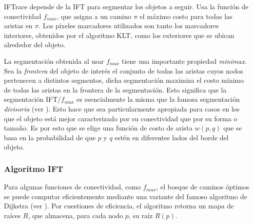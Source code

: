 IFTrace depende de la IFT para segmentar los objetos a seguir. Usa la función
de conectividad $f_{max}$, que asigna a un camino $\pi$ el máximo costo para
todas las aristas en $\pi$. Los píxeles marcadores utilizados son tanto los
marcadores interiores, obtenidos por el algoritmo KLT, como los exteriores que
se ubican alrededor del objeto.

La segmentación obtenida al usar $f_{max}$ tiene una importante propiedad
\textit{minimax}. Sea la \textit{frontera} del objeto de interés el conjunto de
todas las aristas cuyos nodos pertenecen a distintos segmentos, dicha
segmentación maximiza el costo mínimo de todas las aristas en la frontera de la
segmentación. Esto significa que la segmentación IFT/$f_{max}$ es esencialmente
la misma que la famosa segmentación \textit{divisoria} (ver
\cite{IFT}). Esto hace que sea particularmente apropiada
para casos en los que el objeto está mejor caracterizado por su conectividad
que por su forma o tamaño. Es por esto que se elige una función de costo de
arista $w(p,q)$ que se basa en la probabilidad de que $p$ y $q$ estén en
diferentes lados del borde del objeto.

\subsubsection{Algoritmo IFT}

Para algunas funciones de conectividad, como $f_{max}$, el bosque de caminos
óptimos se puede computar eficientemente mediante una variante del famoso
algoritmo de Dijkstra (ver \cite{IFT}). Por cuestiones de
eficiencia, el algoritmo retorna un mapa de raíces $R$, que almacena, para
cada nodo $p$, su raíz $R(p)$.\\

